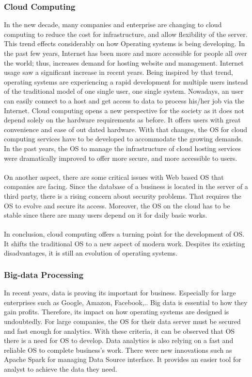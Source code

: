 \subsubsection{Cloud Computing}
In the new decade, many companies and enterprise are changing to cloud computing to reduce the cost for infrastructure, and allow flexibility of the server. This trend effects considerably on how Operating systems is being developing. 
In the past few years, Internet has been more and more accessible for people all over the world; thus, increases demand for hosting website and management. Internet usage saw a significant increase in recent years. 
Being inspired by that trend, operating systems are experiencing a rapid development for multiple users instead of the traditional model of one single user, one single system.
Nowadays, an user can easily connect to a host and get access to data to process his/her job via the Internet. Cloud computing opens a new perspective for the society as it does not depend solely on the hardware requirements as before.
It offers users with great convenience and ease of out dated hardware.
With that changes, the OS for cloud computing services have to be developed to accommodate the growing demands. 
In the past years, the OS to manage the infrastructure of cloud hosting services were dramatically improved to offer more secure, and more accessible to users.\\
\\
On another aspect, there are some critical issues with Web based OS that companies are facing. Since the database of a business is located in the server of a third party, there is a rising concern about security problems. That requires the OS to evolve and secure its access. 
Moreover, the OS on the cloud has to be stable since there are many users depend on it for daily basic works. \\
\\
In conclusion, cloud computing offers a turning point for the development of OS. It shifts the traditional OS to a new aspect of modern work. 
Despites its existing disadvantages, it is still an evolution of operating systems.

\newpage
\subsubsection{Big-data Processing}
In recent years, data is proving its important for business. Especially for large enterprises such as Google, Amazon, Facebook,.. Big data is essential to how they gain profits. Therefore, its impact on how operating systems are designed is undoubtedly. 
For large companies, the OS for their data server must be secured and fast enough for analytics. 
With these criteria, it can be observed that OS there is a need for OS to develop. 
Data analytics is also relying on a fast and reliable OS to complete business's work. There were new innovations such as Apache Spark for managing Data Source interface. It provides an easier tool for analyst to achieve the data they need. 


